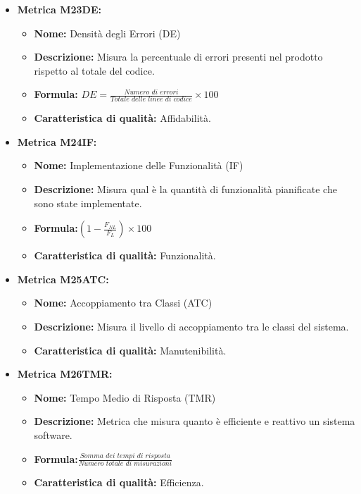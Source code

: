 \begin{itemize}
            \item \textbf{Metrica M23DE:}
                  \begin{itemize}
                      \item \textbf{Nome:} Densità degli Errori (DE)
                      \item \textbf{Descrizione:} Misura la percentuale di errori presenti nel prodotto rispetto al totale del codice.
                      \item \textbf{Formula:} $DE = \frac{\textit{Numero di errori}}{\textit{Totale delle linee di codice}} \times 100$
                      \item \textbf{Caratteristica di qualità:} Affidabilità.
                  \end{itemize}

            \item \textbf{Metrica M24IF:}
                  \begin{itemize}
                      \item \textbf{Nome:} Implementazione delle Funzionalità (IF)
                      \item \textbf{Descrizione:} Misura qual è la quantità di funzionalità pianificate che sono state implementate.
                      \item \textbf{Formula:}$(1 - \frac{F_{NL}}{F_L}) \times 100$
                      \item \textbf{Caratteristica di qualità:} Funzionalità.
                  \end{itemize}


            \item \textbf{Metrica M25ATC:}
                  \begin{itemize}
                      \item \textbf{Nome:} Accoppiamento tra Classi (ATC)
                      \item \textbf{Descrizione:} Misura il livello di accoppiamento tra le classi del sistema.
                      \item \textbf{Caratteristica di qualità:} Manutenibilità.
                  \end{itemize}


            \item \textbf{Metrica M26TMR:}
                  \begin{itemize}
                      \item \textbf{Nome:} Tempo Medio di Risposta (TMR)
                      \item \textbf{Descrizione:} Metrica che misura quanto è efficiente e reattivo un sistema software.
                      \item \textbf{Formula:}$\frac{\textit{Somma dei tempi di risposta}}{\textit{Numero totale di misurazioni}}$
                      \item \textbf{Caratteristica di qualità:} Efficienza.
                    \end{itemize}  



\end{itemize}
